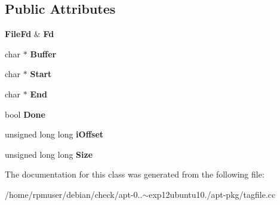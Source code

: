 \subsection*{\-Public \-Attributes}
\begin{DoxyCompactItemize}
\item 
{\bf \-File\-Fd} \& {\bfseries \-Fd}\label{classpkgTagFilePrivate_a8e882281c79416d5527c21567d30ae53}

\item 
char $\ast$ {\bfseries \-Buffer}\label{classpkgTagFilePrivate_ad1bb1e1f60b391156e2a18c4a7fe6033}

\item 
char $\ast$ {\bfseries \-Start}\label{classpkgTagFilePrivate_aa97b3b87588dad2b1b2ebc2d7b7ca2b5}

\item 
char $\ast$ {\bfseries \-End}\label{classpkgTagFilePrivate_a9cb64b868554b25cadb1ebc5681b5d04}

\item 
bool {\bfseries \-Done}\label{classpkgTagFilePrivate_ac3fdeca3b63101bb46822fca80eacc18}

\item 
unsigned long long {\bfseries i\-Offset}\label{classpkgTagFilePrivate_a229bddc27ab737c317251c25fbfc9da1}

\item 
unsigned long long {\bfseries \-Size}\label{classpkgTagFilePrivate_a254f9ca5c1e1232788dedebd142044aa}

\end{DoxyCompactItemize}


\-The documentation for this class was generated from the following file\-:\begin{DoxyCompactItemize}
\item 
/home/rpmuser/debian/check/apt-\/0..$\sim$exp12ubuntu10./apt-\/pkg/tagfile.\-cc\end{DoxyCompactItemize}
